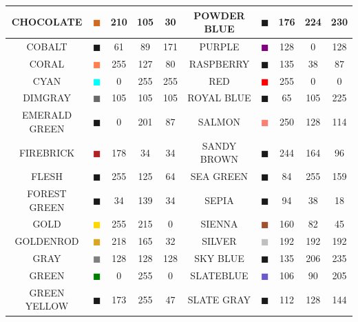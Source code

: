 \documentclass[11pt]{book}
\begin{document}
\begin{table}[p]
\begin{center}
\begin{tabular}{|c|c|c|c|c|c||c|c|c|c|}
{\ct CHOCOLATE} & \textcolor{CHOCOLATE} {$\blacksquare$} & 210& 105& 30& {\ct POWDER BLUE} &  \textcolor{POWDER BLUE} {$\blacksquare$} & 176& 224& 230  \\ \hline
{\ct COBALT} & \textcolor{COBALT} {$\blacksquare$} & 61& 89& 171& {\ct PURPLE} &  \textcolor{PURPLE} {$\blacksquare$} & 128& 0& 128  \\ \hline
{\ct CORAL} & \textcolor{CORAL} {$\blacksquare$} & 255& 127& 80& {\ct RASPBERRY} &  \textcolor{RASPBERRY} {$\blacksquare$} & 135& 38& 87  \\ \hline
{\ct CYAN} & \textcolor{CYAN} {$\blacksquare$} & 0& 255& 255& {\ct RED} &  \textcolor{RED} {$\blacksquare$} & 255& 0& 0  \\ \hline
{\ct DIMGRAY } & \textcolor{DIMGRAY } {$\blacksquare$} & 105& 105& 105& {\ct ROYAL BLUE} &  \textcolor{ROYAL BLUE} {$\blacksquare$} & 65& 105& 225  \\ \hline
{\ct EMERALD GREEN} & \textcolor{EMERALD GREEN} {$\blacksquare$} & 0& 201& 87& {\ct SALMON} &  \textcolor{SALMON} {$\blacksquare$} & 250& 128& 114  \\ \hline
{\ct FIREBRICK} & \textcolor{FIREBRICK} {$\blacksquare$} & 178& 34& 34& {\ct SANDY BROWN} &  \textcolor{SANDY BROWN} {$\blacksquare$} & 244& 164& 96  \\ \hline
{\ct FLESH} & \textcolor{FLESH} {$\blacksquare$} & 255& 125& 64& {\ct SEA GREEN} &  \textcolor{SEA GREEN} {$\blacksquare$} & 84& 255& 159  \\ \hline
{\ct FOREST GREEN} & \textcolor{FOREST GREEN} {$\blacksquare$} & 34& 139& 34& {\ct SEPIA} &  \textcolor{SEPIA} {$\blacksquare$} & 94& 38& 18  \\ \hline
{\ct GOLD } & \textcolor{GOLD } {$\blacksquare$} & 255& 215& 0& {\ct SIENNA} &  \textcolor{SIENNA} {$\blacksquare$} & 160& 82& 45  \\ \hline
{\ct GOLDENROD} & \textcolor{GOLDENROD} {$\blacksquare$} & 218& 165& 32& {\ct SILVER} &  \textcolor{SILVER} {$\blacksquare$} & 192& 192& 192  \\ \hline
{\ct GRAY} & \textcolor{GRAY} {$\blacksquare$} & 128& 128& 128& {\ct SKY BLUE} &  \textcolor{SKY BLUE} {$\blacksquare$} & 135& 206& 235  \\ \hline
{\ct GREEN} & \textcolor{GREEN} {$\blacksquare$} & 0& 255& 0& {\ct SLATEBLUE} &  \textcolor{SLATEBLUE} {$\blacksquare$} & 106& 90& 205  \\ \hline
{\ct GREEN YELLOW} & \textcolor{GREEN YELLOW} {$\blacksquare$} & 173& 255& 47& {\ct SLATE GRAY} &  \textcolor{SLATE GRAY} {$\blacksquare$} & 112& 128& 144  \\ \hline

\end{tabular}
\end{center}
\end{table}
\end{document}
